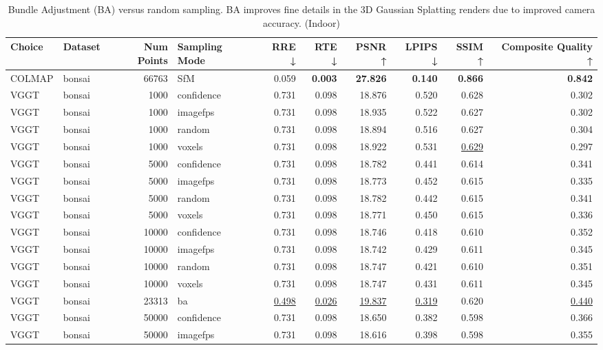 \begin{table}[H]
\caption{\ifdefined\customcaption \customcaption \else Bundle Adjustment (BA) versus random sampling. BA improves fine details in the 3D Gaussian Splatting renders due to improved camera accuracy. (Indoor) \fi}
\label{tab:03_sampling_mode_ba_indoor}
\centering
\tiny
\begin{tabular}{llrlrrrrrr}
\toprule
Choice & Dataset & Num Points & Sampling Mode & RRE ↓ & RTE ↓ & PSNR ↑ & LPIPS ↓ & SSIM ↑ & Composite Quality ↑ \\
\midrule
COLMAP & bonsai & 66763 & SfM & 0.059 & \textbf{0.003} & \textbf{27.826} & \textbf{0.140} & \textbf{0.866} & \textbf{0.842} \\
VGGT & bonsai & 1000 & confidence & 0.731 & 0.098 & 18.876 & 0.520 & 0.628 & 0.302 \\
VGGT & bonsai & 1000 & imagefps & 0.731 & 0.098 & 18.935 & 0.522 & 0.627 & 0.302 \\
VGGT & bonsai & 1000 & random & 0.731 & 0.098 & 18.894 & 0.516 & 0.627 & 0.304 \\
VGGT & bonsai & 1000 & voxels & 0.731 & 0.098 & 18.922 & 0.531 & \underline{0.629} & 0.297 \\
VGGT & bonsai & 5000 & confidence & 0.731 & 0.098 & 18.782 & 0.441 & 0.614 & 0.341 \\
VGGT & bonsai & 5000 & imagefps & 0.731 & 0.098 & 18.773 & 0.452 & 0.615 & 0.335 \\
VGGT & bonsai & 5000 & random & 0.731 & 0.098 & 18.782 & 0.442 & 0.615 & 0.341 \\
VGGT & bonsai & 5000 & voxels & 0.731 & 0.098 & 18.771 & 0.450 & 0.615 & 0.336 \\
VGGT & bonsai & 10000 & confidence & 0.731 & 0.098 & 18.746 & 0.418 & 0.610 & 0.352 \\
VGGT & bonsai & 10000 & imagefps & 0.731 & 0.098 & 18.742 & 0.429 & 0.611 & 0.345 \\
VGGT & bonsai & 10000 & random & 0.731 & 0.098 & 18.747 & 0.421 & 0.610 & 0.351 \\
VGGT & bonsai & 10000 & voxels & 0.731 & 0.098 & 18.747 & 0.431 & 0.611 & 0.345 \\
VGGT & bonsai & 23313 & ba & \underline{0.498} & \underline{0.026} & \underline{19.837} & \underline{0.319} & 0.620 & \underline{0.440} \\
VGGT & bonsai & 50000 & confidence & 0.731 & 0.098 & 18.650 & 0.382 & 0.598 & 0.366 \\
VGGT & bonsai & 50000 & imagefps & 0.731 & 0.098 & 18.616 & 0.398 & 0.598 & 0.355 \\

\end{tabular}
\end{table}
